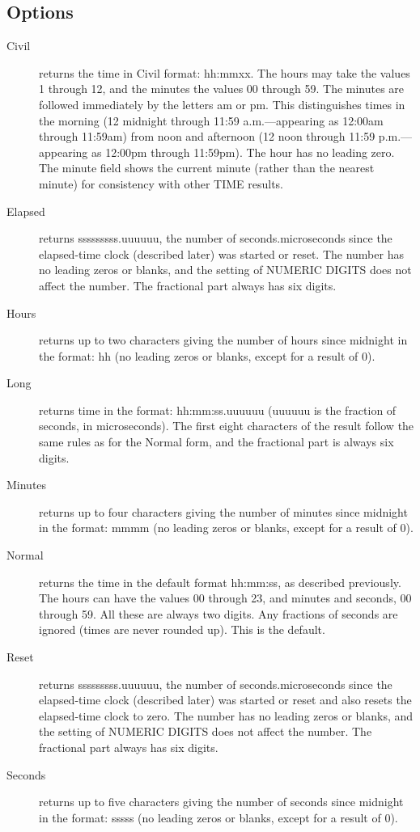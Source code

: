 \subsection{Options}
\begin{description}
\item[Civil]
returns the time in Civil format: hh:mmxx. The hours may take the values 1 through 12, and the minutes the values 00 through 59. The minutes are followed immediately by the letters am or pm. This distinguishes times in the morning (12 midnight through 11:59 a.m.—appearing as 12:00am through 11:59am) from noon and afternoon (12 noon through 11:59 p.m.—appearing as 12:00pm through 11:59pm). The hour has no leading zero. The minute field shows the current minute (rather than the nearest minute) for consistency with other TIME results.
\item[Elapsed]
returns sssssssss.uuuuuu, the number of seconds.microseconds since the elapsed-time clock (described later) was started or reset. The number has no leading zeros or blanks, and the setting of NUMERIC DIGITS does not affect the number. The fractional part always has six digits.
\item[Hours]
returns up to two characters giving the number of hours since midnight in the format: hh (no leading zeros or blanks, except for a result of 0).
\item[Long]
returns time in the format: hh:mm:ss.uuuuuu (uuuuuu is the fraction of seconds, in microseconds). The first eight characters of the result follow the same rules as for the Normal form, and the fractional part is always six digits.
\item[Minutes]
returns up to four characters giving the number of minutes since midnight in the format: mmmm (no leading zeros or blanks, except for a result of 0).
\item[Normal]
returns the time in the default format hh:mm:ss, as described previously. The hours can have the values 00 through 23, and minutes and seconds, 00 through 59. All these are always two digits. Any fractions of seconds are ignored (times are never rounded up). This is the default.
\item[Reset]
returns sssssssss.uuuuuu, the number of seconds.microseconds since the elapsed-time clock (described later) was started or reset and also resets the elapsed-time clock to zero. The number has no leading zeros or blanks, and the setting of NUMERIC DIGITS does not affect the number. The fractional part always has six digits.
\item[Seconds]
returns up to five characters giving the number of seconds since midnight in the format: sssss (no leading zeros or blanks, except for a result of 0).
\end{description}
